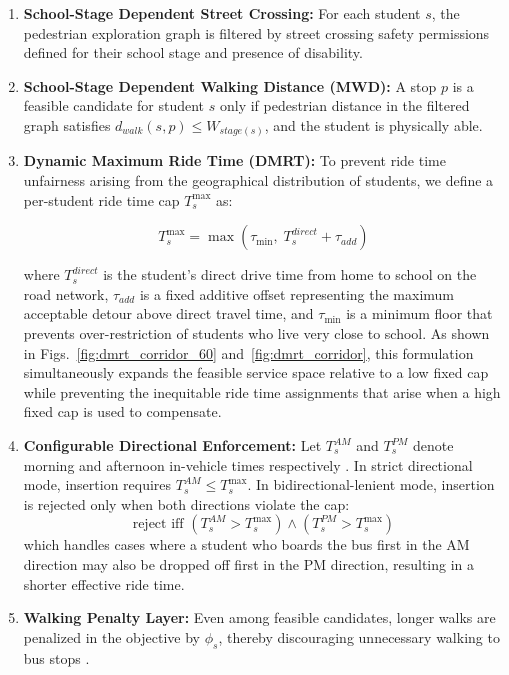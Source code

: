\documentclass[journal]{IEEEtran}
\begin{document}
\begin{enumerate}

\item \textbf{School-Stage Dependent Street Crossing:} For each 
student $s$, the pedestrian exploration graph is filtered by street 
crossing safety permissions defined for their school stage and 
 presence of disability.

\item \textbf{School-Stage Dependent Walking Distance (MWD):} A 
stop $p$ is a feasible candidate for student $s$ only if pedestrian 
distance in the filtered graph satisfies $d_{walk}(s,p) \le 
W_{stage(s)}$, and the student is physically able.

\item \textbf{Dynamic Maximum Ride Time (DMRT):} To prevent 
ride time unfairness arising from the geographical distribution of 
students, we define a per-student ride time cap 
$T^{\max}_s$ as:

\begin{equation}
T^{\max}_s = \max\!\left(\tau_{\min},\; T^{direct}_s + 
\tau_{add}\right)
\label{eq:dmrt}
\end{equation}

where $T^{direct}_s$ is the student's direct drive time from home 
to school on the road network, $\tau_{add}$ is a fixed additive 
offset representing the maximum acceptable detour above direct 
travel time, and $\tau_{\min}$ is a minimum floor that prevents 
over-restriction of students who live very close to school. As 
shown in Figs.~\ref{fig:dmrt_corridor_60} 
and~\ref{fig:dmrt_corridor}, this formulation simultaneously 
expands the feasible service space relative to a low fixed cap 
while preventing the inequitable ride time assignments that arise 
when a high fixed cap is used to compensate.

\item \textbf{Configurable Directional Enforcement:} Let 
$T^{AM}_s$ and $T^{PM}_s$ denote morning and afternoon in-vehicle 
times respectively \cite{c15}. In strict directional mode, 
insertion requires $T^{AM}_s \le T^{\max}_s$. In 
bidirectional-lenient mode, insertion is rejected only when both 
directions violate the cap:
\begin{equation}
\text{reject iff } \left(T^{AM}_s > T^{\max}_s\right) \wedge 
\left(T^{PM}_s > T^{\max}_s\right)
\end{equation}
which handles cases where a student who boards the bus first in 
the AM direction may also be dropped off first in the PM direction, 
resulting in a shorter effective ride time.

\item \textbf{Walking Penalty Layer:} Even among feasible 
candidates, longer walks are penalized in the objective by $\phi_s$, 
thereby discouraging unnecessary walking to bus stops \cite{c14}.

\end{enumerate}
\end{document}
